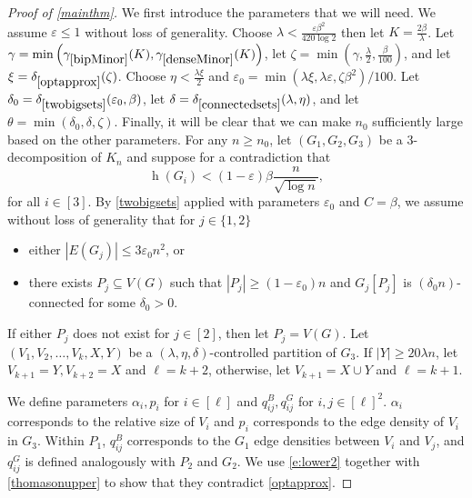 \documentclass{article}
\newcommand{\eps}{\varepsilon}
\newcommand{\s}[1]{\left(#1\right)}
\DeclareMathOperator{\had}{h}
\begin{document}
\begin{proof}[Proof of \cref{mainthm}]
We first introduce the parameters that we will need. We assume $\eps \leq 1$ without loss of generality. Choose $\lambda < \frac{\eps \beta^2}{420 \log 2}$ then let $K = \frac{2\beta}{\lambda}$. Let $\gamma = \min\s{\gamma_{\ref{bipMinor}}(K), \gamma_{\ref{denseMinor}}(K)}$, let $\zeta = \min\s{\gamma, \frac\lambda2, \frac\beta{100}}$, and let $\xi = \delta_{\ref{optapprox}}(\zeta)$. Choose $\eta < \frac{\lambda \xi}2$ and $\eps_0 = \min\s{\lambda \xi, \lambda \eps, \zeta \beta^2}/100$. Let $\delta_0 = \delta_{\ref{twobigsets}}(\eps_0, \beta)$, let $\delta = \delta_{\ref{connectedsets}}(\lambda, \eta)$, and let $\theta = \min\s{\delta_0, \delta, \zeta}$. Finally, it will be clear that we can make $n_0$ sufficiently large based on the other parameters. %
For any $n \geq n_0$, let $(G_1, G_2,G_3)$ be a 3-decomposition of $K_n$ and suppose for a contradiction that
\begin{equation}\label{e:lower2} \had(G_i) < (1- \eps) \beta \frac{n}{\sqrt{\log n}}, \end{equation}
for all $i \in [3]$. By \cref{twobigsets}  applied with parameters $\eps_0$  and $C=\beta$, we assume without loss of generality that for $j \in \{1,2\}$  \begin{itemize} \item either $|E(G_j)| \leq 3\eps_0n^2$, or \item 
there exists $P_j \subseteq V(G)$ such that $|P_j|\geq (1-\eps_0)n$ and $G_j[P_j]$ is $(\delta_0 n)$-connected for some $\delta_0 > 0$.\end{itemize} If either $P_j$ does not exist for $j \in [2]$, then let $P_j = V(G)$. Let $(V_1,V_2,\ldots,V_{k},X,Y)$ be a $(\lambda,\eta,\delta)$-controlled partition of $G_3$. If $|Y| \geq 20\lambda n$, let $V_{k+1}=Y,V_{k+2}=X$ and $\ell=k+2$, otherwise, let $V_{k+1}=X \cup Y$ and $\ell=k+1$.

We  define parameters $\alpha_i, p_i$ for $i \in [\ell]$ and  $q_{ij}^B, q_{ij}^G$ for $i, j \in [\ell]^2$. $\alpha_i$ corresponds to the relative size of $V_i$ and $p_i$ corresponds to the edge density of $V_i$ in $G_3$. Within $P_1$, $q_{ij}^B$ corresponds to the $G_1$ edge densities between $V_i$ and $V_j$, and $q_{ij}^G$ is defined analogously with $P_2$ and $G_2$. We use \eqref{e:lower2} together with \cref{thomasonupper} to show that they contradict \cref{optapprox}. 


\end{proof}
\end{document}
